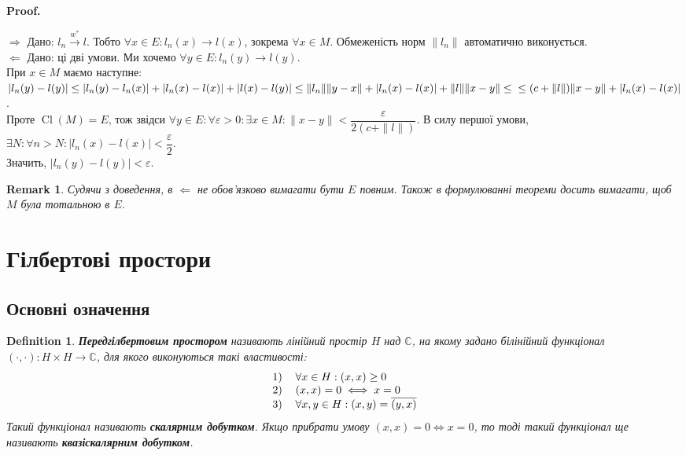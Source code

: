\documentclass[a4paper, 10pt]{article}
\makeatletter
\def\rightproof{$\boxed{\Rightarrow}$ }
\def\leftproof{$\boxed{\Leftarrow}$ }
\theoremstyle{theoremdd}
\theoremstyle{theoremdd}
\newtheorem{definition}[theorem]{Definition}
\theoremstyle{theoremdd}
\theoremstyle{theoremdd}
\theoremstyle{theoremdd}
\theoremstyle{theoremdd}
\newtheorem{remark}[theorem]{Remark}
\theoremstyle{theoremdd}
\theoremstyle{theoremdd}
\newcommand{\toweakstar}{\overset{w^*}{\to}}
\renewenvironment{proof}[1][Proof.\\]{\par
\pushQED{\hfill \qed}%
\normalfont \topsep6\p@\@plus6\p@\relax
\trivlist
\item\relax
{\bfseries
#1\@addpunct{.}}\hspace\labelsep\ignorespaces
}{%
\popQED\endtrivlist\@endpefalse
}
\DeclareMathOperator{\Cl}{Cl}
\makeatother
\begin{document}
\begin{proof}
\rightproof Дано: $l_n \toweakstar l$. Тобто $\forall x \in E: l_n(x) \to l(x)$, зокрема $\forall x \in M$. Обмеженість норм $\|l_n\|$ автоматично виконується.
\bigskip \\
\leftproof Дано: ці дві умови. Ми хочемо $\forall y \in E: l_n(y) \to l(y)$.\\
При $x \in M$ маємо наступне:\\
$|l_n(y) - l(y)| \leq |l_n(y) - l_n(x)| + |l_n(x) - l(x)| + |l(x) - l(y)| \leq \| l_n \| \| y - x \| + |l_n(x) - l(x)| + \|l\| \|x-y\| \leq \\
\leq (c + \|l\|) \|x-y\| + |l_n(x) - l(x)|$.\\
Проте $\Cl(M) = E$, тож звідси $\forall y \in E: \forall \varepsilon > 0: \exists x \in M: \|x-y\| < \dfrac{\varepsilon}{2(c+ \|l\|)}$. В силу першої умови, $\exists N: \forall n > N: |l_n(x) - l(x)| < \dfrac{\varepsilon}{2}$.\\
Значить, $|l_n(y) - l(y)| < \varepsilon$.
\end{proof}

\begin{remark}
Судячи з доведення, в \leftproof не обов'язково вимагати бути $E$ повним. Також в формулюванні теореми досить вимагати, щоб $M$ була тотальною в $E$.
\end{remark}
\newpage

\section{Гілбертові простори}
\subsection{Основні означення}
\begin{definition}
\textbf{Передгілбертовим простором} називають лінійний простір $H$ над $\mathbb{C}$, на якому задано білінійний функціонал $(\cdot, \cdot) \colon H \times H \to \mathbb{C}$, для якого виконуються такі властивості:
\begin{align*}
\begin{tabular}{cl}
1) & $\forall x \in H: (x, x) \geq 0$\\
2) & $(x, x) = 0 \iff x = 0$\\
3) & $\forall x,y \in H: (x, y) = \overline{(y, x)}$
\end{tabular}
\end{align*}
Такий функціонал називають \textbf{скалярним добутком}. Якщо прибрати умову $(x,x) = 0 \iff x = 0$, то тоді такий функціонал ще називають \textbf{квазіскалярним добутком}.
\end{definition}
\end{document}
